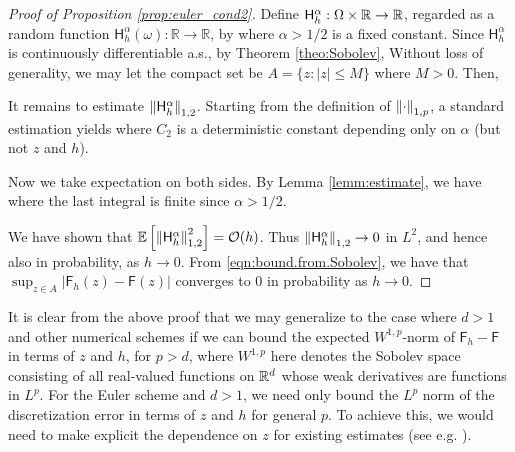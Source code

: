\documentclass[twoside]{article}
\begin{document}
\begin{proof}[Proof of Proposition \ref{prop:euler_cond2}]
Define $\mathsf{H}^\alpha_h: \Omega \times \mathbb{R} \to \mathbb{R}$, regarded as a random function $\mathsf{H}^\alpha_h(\omega): \mathbb{R} \rightarrow \mathbb{R}$, by 
where $\alpha > 1/2$ is a fixed constant. Since $\mathsf{H}_h^\alpha$ is continuously differentiable a.s., by Theorem \ref{theo:Sobolev},
Without loss of generality, we may let the compact set be $A = \{z : |z| \leq M\}$ where $M > 0$. Then,

It remains to estimate $\left\|\mathsf{H}_h^\alpha \right\|_{1,2}$. Starting from the definition of $\left\|\cdot \right\|_{1, p}$, a standard estimation yields
where $C_2$ is a deterministic constant depending only on $\alpha$ (but not $z$ and $h$). 

Now we take expectation on both sides. By Lemma \ref{lemm:estimate}, we have
where the last integral is finite since $\alpha > 1/2$.

We have shown that $\mathbb{E} \left[ \left\|\mathsf{H}_h^\alpha \right\|_{1,2}^2 \right] = \mathcal{O}(h)$. Thus $\left\|\mathsf{H}_h^\alpha \right\|_{1,2} \to 0$ in $L^2$, and hence also in probability, as $h\to 0$. From \eqref{eqn:bound.from.Sobolev}, we have that $\sup_{z \in A} | \mathsf{F}_h(z) - \mathsf{F}(z) |$ converges to $0$ in probability as $h \rightarrow 0$.
\end{proof}

It is clear from the above proof that we may generalize to the case where $d > 1$ and other numerical schemes if we can bound the expected $W^{1, p}$-norm of $\mathsf{F}_h - \mathsf{F}$ in terms of $z$ and $h$, for $p > d$,
where $W^{1, p}$ here denotes the Sobolev space consisting of all real-valued functions on $\mathbb{R}^d$ whose weak derivatives are functions in $L^p$.
For the Euler scheme and $d > 1$, we need only bound the $L^p$ norm of the discretization error in terms of $z$ and $h$ for general $p$.
To achieve this, we would need to make explicit the dependence on $z$ for existing estimates (see e.g. \cite[Chapter 10]{kloeden2013numerical}).
\end{document}
